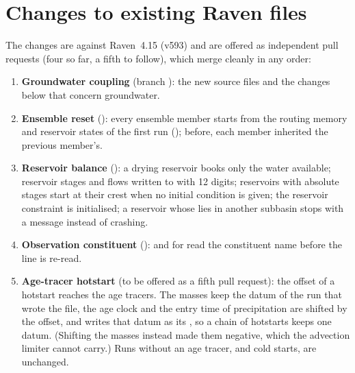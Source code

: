 \section{Changes to existing Raven files}\label{sec:coreflix}
The changes are against Raven~4.15 (v593) and are offered as independent pull requests (four so far, a fifth to follow), which merge cleanly in any
order:
\begin{enumerate}
\item \textbf{Groundwater coupling} (branch ): the new source files and the changes below that
      concern groundwater.
\item \textbf{Ensemble reset} (): every ensemble member starts from the routing memory and
      reservoir states of the first run (); before, each member inherited the previous
      member's.
\item \textbf{Reservoir balance} (): a drying reservoir books only the water available;
      reservoir stages and flows written to  with 12 digits; reservoirs with absolute stages start at
      their crest when no initial condition is given; the reservoir constraint is initialised; a reservoir whose
       lies in another subbasin stops with a message instead of crashing.
\item \textbf{Observation constituent} ():  and
       for  read the constituent name before the line is re-read.
\item \textbf{Age-tracer hotstart} (to be offered as a fifth pull request): the  offset of a
      hotstart reaches the age tracers. The masses keep the datum of the run that wrote the file, the age clock and the
      entry time of precipitation are shifted by the offset, and  writes that datum as its
      , so a chain of hotstarts keeps one datum. (Shifting the masses instead made them negative, which
      the advection limiter cannot carry.) Runs without an age tracer, and cold starts, are unchanged.
\end{enumerate}
